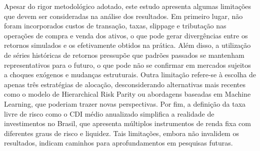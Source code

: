Apesar do rigor metodológico adotado, este estudo apresenta algumas limitações que devem ser consideradas na análise dos resultados. Em primeiro lugar, não foram incorporados custos de transação, taxas, slippage e tributação nas operações de compra e venda dos ativos, o que pode gerar divergências entre os retornos simulados e os efetivamente obtidos na prática. Além disso, a utilização de séries históricas de retornos pressupõe que padrões passados se mantenham representativos para o futuro, o que pode não se confirmar em mercados sujeitos a choques exógenos e mudanças estruturais. Outra limitação refere-se à escolha de apenas três estratégias de alocação, desconsiderando alternativas mais recentes como o modelo de Hierarchical Risk Parity ou abordagens baseadas em Machine Learning, que poderiam trazer novas perspectivas. Por fim, a definição da taxa livre de risco como o CDI médio anualizado simplifica a realidade de investimentos no Brasil, que apresenta múltiplos instrumentos de renda fixa com diferentes graus de risco e liquidez. Tais limitações, embora não invalidem os resultados, indicam caminhos para aprofundamentos em pesquisas futuras.